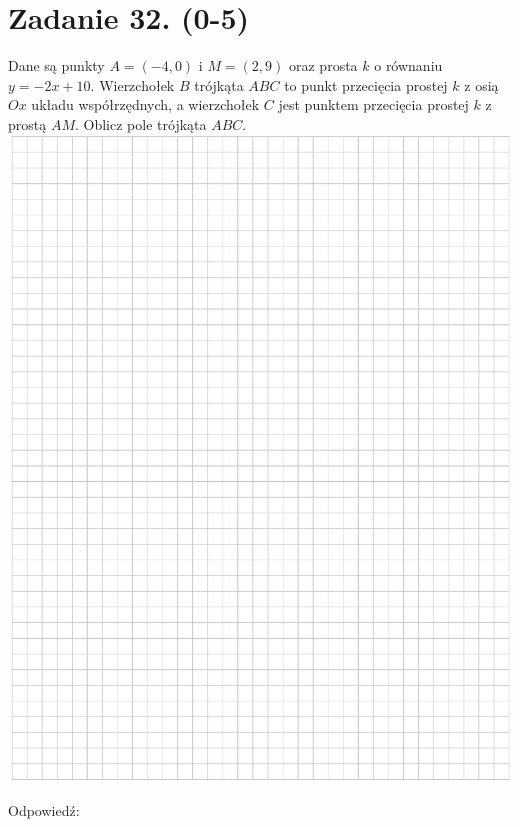 \documentclass[10pt]{article}
\begin{document}
\section*{Zadanie 32. (0-5)}
Dane są punkty \(A=(-4,0)\) i \(M=(2,9)\) oraz prosta \(k\) o równaniu \(y=-2 x+10\). Wierzchołek \(B\) trójkąta \(A B C\) to punkt przecięcia prostej \(k\) z osią \(O x\) układu współrzędnych, a wierzchołek \(C\) jest punktem przecięcia prostej \(k\) z prostą \(A M\). Oblicz pole trójkąta \(A B C\).\\
\includegraphics[max width=\textwidth, center]{2024_11_21_7b5527312ea89ae66fd0g-22}

Odpowiedź:
\end{document}
